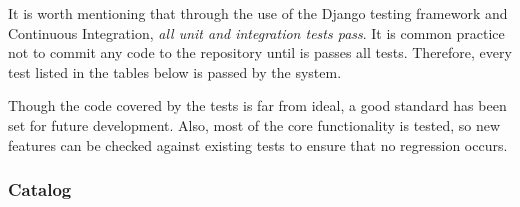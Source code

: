 It is worth mentioning that through the use of the Django testing framework and
Continuous Integration, \emph{all unit and integration tests pass}. It is
common practice not to commit any code to the repository until is passes all
tests. Therefore, every test listed in the tables below is passed by the
system.

Though the code covered by the tests is far from ideal, a good standard has
been set for future development. Also, most of the core functionality is
tested, so new features can be checked against existing tests to ensure that no
regression occurs.

\subsubsection{Catalog}

